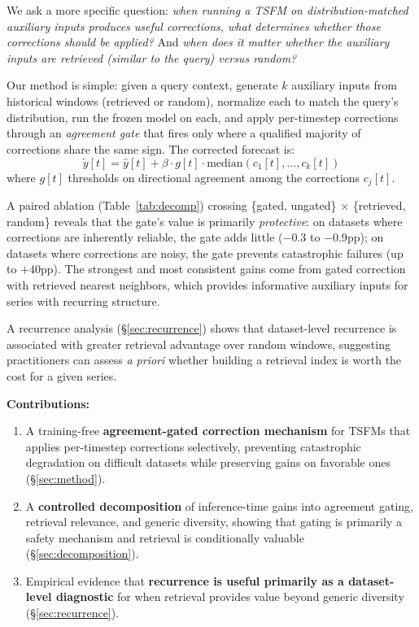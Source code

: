 \documentclass{article}
\begin{document}
We ask a more specific question: \emph{when running a TSFM on distribution-matched auxiliary inputs produces useful corrections, what determines whether those corrections should be applied?} And \emph{when does it matter whether the auxiliary inputs are retrieved (similar to the query) versus random?}

Our method is simple: given a query context, generate $k$ auxiliary inputs from historical windows (retrieved or random), normalize each to match the query's distribution, run the frozen model on each, and apply per-timestep corrections through an \emph{agreement gate} that fires only where a qualified majority of corrections share the same sign. The corrected forecast is:
\begin{equation}
\tilde{y}[t] = \hat{y}[t] + \beta \cdot g[t] \cdot \text{median}(c_1[t], \ldots, c_k[t])
\end{equation}
where $g[t]$ thresholds on directional agreement among the corrections $c_j[t]$.

A paired ablation (Table~\ref{tab:decomp}) crossing \{gated, ungated\} $\times$ \{retrieved, random\} reveals that the gate's value is primarily \emph{protective}: on datasets where corrections are inherently reliable, the gate adds little ($-0.3$ to $-0.9$pp); on datasets where corrections are noisy, the gate prevents catastrophic failures (up to $+40$pp). The strongest and most consistent gains come from gated correction with retrieved nearest neighbors, which provides informative auxiliary inputs for series with recurring structure.

A recurrence analysis (\S\ref{sec:recurrence}) shows that dataset-level recurrence is associated with greater retrieval advantage over random windows, suggesting practitioners can assess \emph{a priori} whether building a retrieval index is worth the cost for a given series.

\textbf{Contributions:}
\begin{enumerate}
\item A training-free \textbf{agreement-gated correction mechanism} for TSFMs that applies per-timestep corrections selectively, preventing catastrophic degradation on difficult datasets while preserving gains on favorable ones (\S\ref{sec:method}).
\item A \textbf{controlled decomposition} of inference-time gains into agreement gating, retrieval relevance, and generic diversity, showing that gating is primarily a safety mechanism and retrieval is conditionally valuable (\S\ref{sec:decomposition}).
\item Empirical evidence that \textbf{recurrence is useful primarily as a dataset-level diagnostic} for when retrieval provides value beyond generic diversity (\S\ref{sec:recurrence}).
\end{enumerate}
\end{document}
